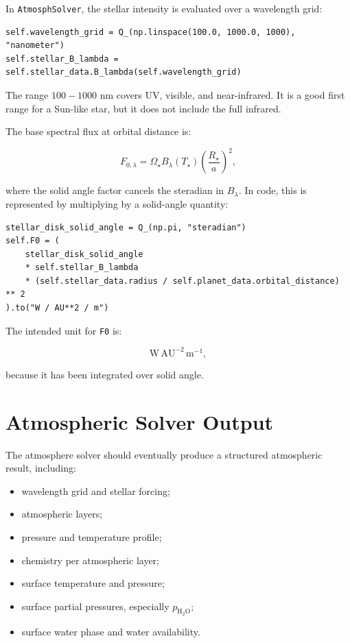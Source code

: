 \documentclass[11pt]{article}
\begin{document}
In \texttt{AtmosphSolver}, the stellar intensity is evaluated over a wavelength
grid:

\begin{lstlisting}
self.wavelength_grid = Q_(np.linspace(100.0, 1000.0, 1000), "nanometer")
self.stellar_B_lambda = self.stellar_data.B_lambda(self.wavelength_grid)
\end{lstlisting}

The range \(100-1000\) nm covers UV, visible, and near-infrared. It is a good
first range for a Sun-like star, but it does not include the full infrared.

The base spectral flux at orbital distance is:

\[
F_{0,\lambda}
= \Omega_\star B_\lambda(T_\star)
\left(\frac{R_\star}{a}\right)^2,
\]

where the solid angle factor cancels the steradian in \(B_\lambda\). In code,
this is represented by multiplying by a solid-angle quantity:

\begin{lstlisting}
stellar_disk_solid_angle = Q_(np.pi, "steradian")
self.F0 = (
    stellar_disk_solid_angle
    * self.stellar_B_lambda
    * (self.stellar_data.radius / self.planet_data.orbital_distance) ** 2
).to("W / AU**2 / m")
\end{lstlisting}

The intended unit for \texttt{F0} is:

\[
\mathrm{W \, AU^{-2} \, m^{-1}},
\]

because it has been integrated over solid angle.

\section{Atmospheric Solver Output}

The atmosphere solver should eventually produce a structured atmospheric result,
including:

\begin{itemize}
  \item wavelength grid and stellar forcing;
  \item atmospheric layers;
  \item pressure and temperature profile;
  \item chemistry per atmospheric layer;
  \item surface temperature and pressure;
  \item surface partial pressures, especially \(p_{\mathrm{H_2O}}\);
  \item surface water phase and water availability.
\end{itemize}
\end{document}
